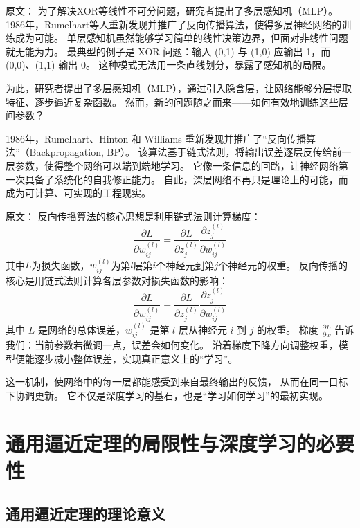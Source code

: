 原文：
为了解决XOR等线性不可分问题，研究者提出了多层感知机（MLP）。1986年，Rumelhart等人重新发现并推广了反向传播算法，使得多层神经网络的训练成为可能。
单层感知机虽然能够学习简单的线性决策边界，但面对非线性问题就无能为力。  
最典型的例子是 XOR 问题：输入 (0,1) 与 (1,0) 应输出 1，而 (0,0)、(1,1) 输出 0。  
这种模式无法用一条直线划分，暴露了感知机的局限。  

为此，研究者提出了多层感知机（MLP），通过引入隐含层，让网络能够分层提取特征、逐步逼近复杂函数。  
然而，新的问题随之而来——如何有效地训练这些层间参数？  

1986年，Rumelhart、Hinton 和 Williams 重新发现并推广了“反向传播算法”（Backpropagation, BP）。  
该算法基于链式法则，将输出误差逐层反传给前一层参数，使得整个网络可以端到端地学习。  
它像一条信息的回路，让神经网络第一次具备了系统化的自我修正能力。  
自此，深层网络不再只是理论上的可能，而成为可计算、可实现的工程现实。

原文：
反向传播算法的核心思想是利用链式法则计算梯度：
\begin{equation}
\frac{\partial L}{\partial w_{ij}^{(l)}} = \frac{\partial L}{\partial z_j^{(l)}} \frac{\partial z_j^{(l)}}{\partial w_{ij}^{(l)}}
\end{equation}
其中$L$为损失函数，$w_{ij}^{(l)}$为第$l$层第$i$个神经元到第$j$个神经元的权重。
反向传播的核心是用链式法则计算各层参数对损失函数的影响：  
\begin{equation}
\frac{\partial L}{\partial w_{ij}^{(l)}} = \frac{\partial L}{\partial z_j^{(l)}} \frac{\partial z_j^{(l)}}{\partial w_{ij}^{(l)}}
\end{equation}
其中 $L$ 是网络的总体误差，$w_{ij}^{(l)}$ 是第 $l$ 层从神经元 $i$ 到 $j$ 的权重。  
梯度 $\frac{\partial L}{\partial w}$ 告诉我们：当前参数若微调一点，误差会如何变化。  
沿着梯度下降方向调整权重，模型便能逐步减小整体误差，实现真正意义上的“学习”。  

这一机制，使网络中的每一层都能感受到来自最终输出的反馈，  
从而在同一目标下协调更新。  
它不仅是深度学习的基石，也是“学习如何学习”的最初实现。


\section{通用逼近定理的局限性与深度学习的必要性}

\subsection{通用逼近定理的理论意义}

